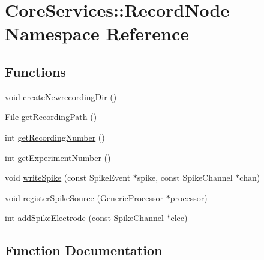 \hypertarget{namespace_core_services_1_1_record_node}{}\section{Core\+Services\+:\+:Record\+Node Namespace Reference}
\label{namespace_core_services_1_1_record_node}
\subsection*{Functions}
\begin{DoxyCompactItemize}
\item 
void \mbox{\hyperlink{namespace_core_services_1_1_record_node_a5a5d166b16a7990cda9d1667cca88031}{create\+Newrecording\+Dir}} ()
\item 
File \mbox{\hyperlink{namespace_core_services_1_1_record_node_aacbae8c35805cac138be95000a31baa2}{get\+Recording\+Path}} ()
\item 
int \mbox{\hyperlink{namespace_core_services_1_1_record_node_a9652eb6869f905f2b131245f62ddaaf1}{get\+Recording\+Number}} ()
\item 
int \mbox{\hyperlink{namespace_core_services_1_1_record_node_aae47e9fe985ef57735c937bbe8379fa7}{get\+Experiment\+Number}} ()
\item 
void \mbox{\hyperlink{namespace_core_services_1_1_record_node_a9475537f3223762f9e1b852ec8d59811}{write\+Spike}} (const Spike\+Event $\ast$spike, const Spike\+Channel $\ast$chan)
\item 
void \mbox{\hyperlink{namespace_core_services_1_1_record_node_a28b8d2f049b63dc524b27a9ae8bc88fe}{register\+Spike\+Source}} (Generic\+Processor $\ast$processor)
\item 
int \mbox{\hyperlink{namespace_core_services_1_1_record_node_a78a757804cb37410aeb3349594030895}{add\+Spike\+Electrode}} (const Spike\+Channel $\ast$elec)
\end{DoxyCompactItemize}


\subsection{Function Documentation}
\mbox{\label{namespace_core_services_1_1_record_node_a78a757804cb37410aeb3349594030895}} 
